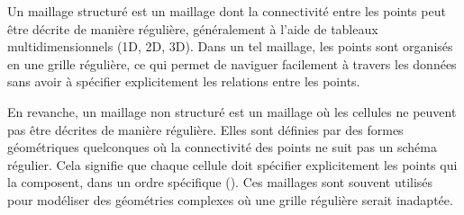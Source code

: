 \label{structure}

Un maillage structuré est un maillage dont la connectivité\label{connectivité} entre les points peut être décrite de manière régulière, généralement à l'aide de tableaux multidimensionnels (1D, 2D, 3D). Dans un tel maillage, les points sont organisés en une grille régulière, ce qui permet de naviguer facilement à travers les données sans avoir à spécifier explicitement les relations entre les points.



En revanche, un maillage non structuré est un maillage où les cellules ne peuvent pas être décrites de manière régulière. Elles sont définies par des formes géométriques quelconques où la connectivité des points ne suit pas un schéma régulier. Cela signifie que chaque cellule doit spécifier explicitement les points qui la composent, dans un ordre spécifique (). Ces maillages sont souvent utilisés pour modéliser des géométries complexes où une grille régulière serait inadaptée.


